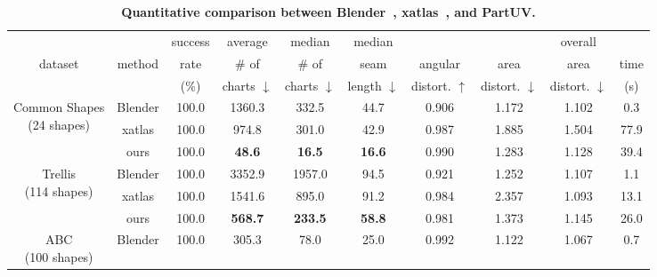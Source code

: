 \begin{table}[t]
  \centering
  \scriptsize
  \setlength{\tabcolsep}{1.2pt}
  \caption{\textbf{Quantitative comparison between Blender~\cite{blender}, xatlas~\cite{xatlas}, and PartUV.} }
    \vspace{-1.5em}
    \begin{tabular}{c|c|cccccccc}
    
    \toprule
          & & \multicolumn{1}{c}{success} &    \multicolumn{1}{c}{average}   & \multicolumn{1}{c}{median}      & \multicolumn{1}{c}{median} &       & \multicolumn{1}{c}{ } & \multicolumn{1}{c}{overall  } & \\
          dataset &  method & \multicolumn{1}{c}{rate} & \multicolumn{1}{c}{\# of}  & \multicolumn{1}{c}{\# of} & \multicolumn{1}{c}{seam} &\multicolumn{1}{c}{angular}  & \multicolumn{1}{c}{area} & \multicolumn{1}{c}{area} &  \multicolumn{1}{c}{time} \\
          &       & \multicolumn{1}{c}{(\%)} & \multicolumn{1}{c}{ charts $\downarrow$} & \multicolumn{1}{c}{ charts $\downarrow$} & \multicolumn{1}{c}{ length $\downarrow$} & \multicolumn{1}{c}{ distort. $\uparrow$} & \multicolumn{1}{c}{distort. $\downarrow$} & \multicolumn{1}{c}{distort. $\downarrow$} & \multicolumn{1}{c}{ (s) } \\
    \midrule
    \multicolumn{1}{c|}{\multirow{3}[0]{*}{\parbox{1.5cm}{\centering Common Shapes\\(24 shapes)}}} 
          & Blender & 100.0 & 1360.3 & 332.5 & 44.7  & 0.906 & 1.172 & 1.102 & 0.3 \\
          & xatlas & 100.0 & 974.8 & 301.0 & 42.9  & 0.987 & 1.885 & 1.504 & 77.9 \\
          & ours  & 100.0 & \textbf{48.6} & \textbf{16.5} & \textbf{16.6} & 0.990 & 1.283 & 1.128 & 39.4 \\
    \midrule
    \multicolumn{1}{c|}{\multirow{3}[0]{*}{\parbox{1.5cm}{\centering Trellis \\ (114 shapes)}}} 
          & Blender & 100.0 & 3352.9 & 1957.0 & 94.5  & 0.921 & 1.252 & 1.107 & 1.1 \\
          & xatlas & 100.0 & 1541.6 & 895.0 & 91.2  & 0.984 & 2.357 & 1.093 & 13.1 \\
          & ours  & 100.0 & \textbf{568.7} & \textbf{233.5} & \textbf{58.8} & 0.981 & 1.373 & 1.145 & 26.0 \\
    \midrule
      \multicolumn{1}{c|}{\multirow{3}[0]{*}{\parbox{1.5cm}{\centering ABC \\ (100 shapes)}}} 
          & Blender & 100.0 & 305.3 & 78.0  & 25.0  & 0.992 & 1.122 & 1.067 & 0.7 \\

\end{tabular}
\end{table}
